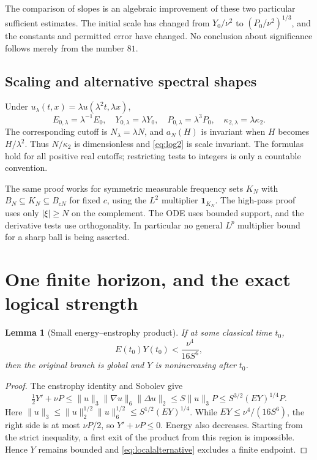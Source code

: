 \documentclass[11pt,a4paper]{article}
\newtheorem{lemma}[theorem]{Lemma}
\theoremstyle{definition}\newtheorem{definition}[theorem]{Definition}
\theoremstyle{remark}\newtheorem{remark}[theorem]{Remark}
\newcommand{\norm}[1]{\lVert #1\rVert}
\numberwithin{equation}{section}
\begin{document}
The comparison of slopes is an algebraic improvement of these two particular sufficient estimates. The initial scale has changed from $Y_0/\nu^2$ to $(P_0/\nu^2)^{1/3}$, and the constants and permitted error have changed. No conclusion about significance follows merely from the number $81$.

\subsection{Scaling and alternative spectral shapes}
Under $u_\lambda(t,x)=\lambda u(\lambda^2t,\lambda x)$,
\[
 E_{0,\lambda}=\lambda^{-1}E_0,\quad
 Y_{0,\lambda}=\lambda Y_0,\quad P_{0,\lambda}=\lambda^3P_0,
 \quad\kappa_{2,\lambda}=\lambda\kappa_2.
\]
The corresponding cutoff is $N_\lambda=\lambda N$, and $a_N(H)$ is invariant when $H$ becomes $H/\lambda^2$. Thus $N/\kappa_2$ is dimensionless and \eqref{eq:log2} is scale invariant. The formulas hold for all positive real cutoffs; restricting tests to integers is only a countable convention.

The same proof works for symmetric measurable frequency sets $K_N$ with $B_N\subseteq K_N\subseteq B_{cN}$ for fixed $c$, using the $L^2$ multiplier $\mathbf1_{K_N}$. The high-pass proof uses only $|\xi|\ge N$ on the complement. The ODE uses bounded support, and the derivative tests use orthogonality. In particular no general $L^p$ multiplier bound for a sharp ball is being asserted.

\section{One finite horizon, and the exact logical strength}
\label{sec:horizon}
\begin{lemma}[Small energy--enstrophy product]\label{lem:smallproduct}
If at some classical time $t_0$,
\begin{equation}\label{eq:smallproduct}
 E(t_0)Y(t_0)<\frac{\nu^4}{16S^6},
\end{equation}
then the original branch is global and $Y$ is nonincreasing after $t_0$.
\end{lemma}
\begin{proof}
The enstrophy identity and Sobolev give
\[
 \tfrac12Y'+\nu P
 \le\norm u_3\norm{\nabla u}_6\norm{\Delta u}_2
 \le S\norm u_3P
 \le S^{3/2}(EY)^{1/4}P.
\]
Here $\norm u_3\le\norm u_2^{1/2}\norm u_6^{1/2}\le S^{1/2}(EY)^{1/4}$. While $EY\le\nu^4/(16S^6)$, the right side is at most $\nu P/2$, so $Y'+\nu P\le0$. Energy also decreases. Starting from the strict inequality, a first exit of the product from this region is impossible. Hence $Y$ remains bounded and \eqref{eq:localalternative} excludes a finite endpoint.
\end{proof}
\end{document}
